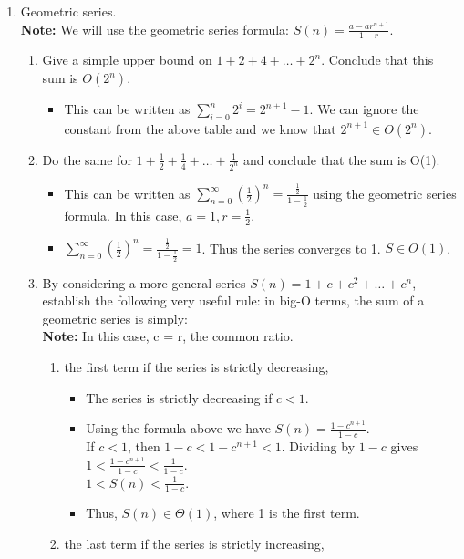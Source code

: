 \documentclass[12pt]{article}
\begin{document}
\begin{enumerate}
\newpage
\item Geometric series. \\
\textbf{Note: } We will use the geometric series formula: $S(n) = \frac{a-ar^{n+1}}{1-r}.$
\begin{enumerate}
	\item Give a simple upper bound on $1+2+4+ \dots +2^n$. Conclude that this sum is $O(2^n)$. 
		\begin{itemize}
			\item This can be written as $\sum_{i = 0}^{n} 2^i = 2^{n+1}-1.$ We can ignore the constant from the above table and we know that $2^{n+1} \in O(2^n).$
		\end{itemize}
	\item Do the same for $1+ \frac{1}{2 }+ \frac{1}{4} + \dots + \frac{1}{2^n} $ and conclude that the sum is O(1).
		\begin{itemize}
			\item This can be written as $\sum_{n = 0}^{\infty} (\frac{1}{2})^n = \frac{\frac{1}{2}}{1 - \frac{1}{2}}$ using the geometric series formula. In this case, $a = 1, r = \frac{1}{2}.$
			\item $\sum_{n = 0}^{\infty} (\frac{1}{2})^n = \frac{\frac{1}{2}}{1 - \frac{1}{2}} = 1$. Thus the series converges to 1. $S \in O(1)$.
		\end{itemize}
	\item By considering a more general series $S(n) = 1 + c + c^2 +  \dots + c^n$, establish the following very useful rule: in big-O terms, the sum of a geometric series is simply: \\
	\textbf{Note: } In this case, c = r, the common ratio.
\begin{enumerate}
\item the first term if the series is strictly decreasing, 
	\begin{itemize}
		\item The series is strictly decreasing if $c < 1$.
		\item Using the formula above we have $S(n) = \frac{1-c^{n+1}}{1-c}$.\\
		If $c < 1$, then $1-c < 1-c^{n+1} < 1$. Dividing by $1-c$ gives
		$1 < \frac{1-c^{n+1}}{1-c} < \frac{1}{1-c}$. \\
		$1 < S(n) < \frac{1}{1-c}$.
		\item Thus, $S(n) \in \Theta(1)$, where 1 is the first term.
	\end{itemize}
\item  the last term if the series is strictly increasing, 

\end{enumerate}
\end{enumerate}
\end{enumerate}
\end{document}
